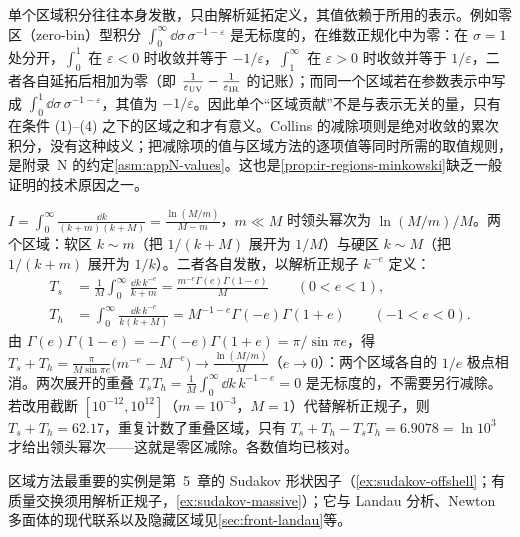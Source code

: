 \begin{remark}[发散区域积分的值依赖于表示]\label{rem:ir-regions-values}
单个区域积分往往本身发散，只由解析延拓定义，其值依赖于所用的表示。例如零区（zero-bin）型积分 $\int_0^\infty\dd\sigma\,\sigma^{-1-\varepsilon}$ 是无标度的，在维数正规化中为零：在 $\sigma=1$ 处分开，$\int_0^1$ 在 $\varepsilon<0$ 时收敛并等于 $-1/\varepsilon$，$\int_1^\infty$ 在 $\varepsilon>0$ 时收敛并等于 $1/\varepsilon$，二者各自延拓后相加为零（即 $\frac1{\varepsilon_{\rm UV}}-\frac1{\varepsilon_{\rm IR}}$ 的记账）；而同一个区域若在参数表示中写成 $\int_0^1\dd\sigma\,\sigma^{-1-\varepsilon}$，其值为 $-1/\varepsilon$。因此单个“区域贡献”不是与表示无关的量，只有在条件 (1)--(4) 之下的区域之和才有意义。Collins 的减除项则是绝对收敛的累次积分，没有这种歧义；把减除项的值与区域方法的逐项值等同时所需的取值规则，是附录~N 的约定\cref{asm:appN-values}。这也是\cref{prop:ir-regions-minkowski}缺乏一般证明的技术原因之一。
\end{remark}

\begin{example}[一维玩具积分与零区减除]\label{ex:ir-regions-toy}
$I=\int_0^\infty\frac{\dd k}{(k+m)(k+M)}=\frac{\ln(M/m)}{M-m}$，$m\ll M$ 时领头幂次为 $\ln(M/m)/M$。两个区域：软区 $k\sim m$（把 $1/(k+M)$ 展开为 $1/M$）与硬区 $k\sim M$（把 $1/(k+m)$ 展开为 $1/k$）。二者各自发散，以解析正规子 $k^{-e}$ 定义：
\begin{equation}\label{eq:ir-toy-regions}
\begin{aligned}
T_s&=\frac1M\int_0^\infty\frac{\dd k\,k^{-e}}{k+m}=\frac{m^{-e}\Gamma(e)\Gamma(1-e)}{M}\qquad(0<e<1),\\
T_h&=\int_0^\infty\frac{\dd k\,k^{-e}}{k(k+M)}=M^{-1-e}\Gamma(-e)\Gamma(1+e)\qquad(-1<e<0).
\end{aligned}
\end{equation}
由 $\Gamma(e)\Gamma(1-e)=-\Gamma(-e)\Gamma(1+e)=\pi/\sin\pi e$，得 $T_s+T_h=\frac{\pi}{M\sin\pi e}\big(m^{-e}-M^{-e}\big)\to\frac{\ln(M/m)}{M}$（$e\to0$）：两个区域各自的 $1/e$ 极点相消。两次展开的重叠 $T_sT_h=\frac1M\int_0^\infty\dd k\,k^{-1-e}=0$ 是无标度的，不需要另行减除。若改用截断 $[10^{-12},10^{12}]$（$m=10^{-3}$，$M=1$）代替解析正规子，则 $T_s+T_h=62.17$，重复计数了重叠区域，只有 $T_s+T_h-T_sT_h=6.9078=\ln10^3$ 才给出领头幂次——这就是零区减除。各数值均已核对。
\end{example}

区域方法最重要的实例是第~5~章的 Sudakov 形状因子（\cref{ex:sudakov-offshell}；有质量交换须用解析正规子，\cref{ex:sudakov-massive}）；它与 Landau 分析、Newton 多面体的现代联系以及隐藏区域见\cref{sec:front-landau}等。

